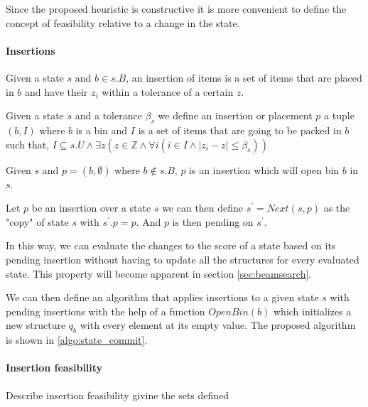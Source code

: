 Since the proposed heuristic is constructive it is more convenient to define the concept of feasibility relative to a change in the state.

\paragraph*{Insertions}

Given a state $s$ and $b \in s.B$, an insertion of items is a set of items that are placed in $b$ and have their $z_i$ within a tolerance of a certain $z$.

\begin{definition}[Insertion]
    \label{def:insertion}%
    Given a state $s$ and a tolerance $\beta_s$ we define an insertion or placement $p$ a tuple $(b, I)$ where $b$ is a bin and $I$ is a set of items that are going to be packed in $b$ such that, $I \subseteq s.U \land \exists z (z \in \mathbb{Z} \land \forall i ( i \in I \land |z_i - z| \le \beta_s))$
\end{definition}

\begin{observation}
    \label{oss:state_bin_open}
    Given $s$ and $p = (b, \emptyset)$ where $b \notin s.B$, $p$ is an insertion which will open bin $b$ in $s$.
\end{observation}

\begin{definition}[Next]
    \label{def:state_next}%
    Let $p$ be an insertion over a state $s$ we can then define $s^\prime = Next(s, p)$ as the "copy" of state $s$ with $s^\prime.p = p$. And $p$ is then pending on $s^\prime$.
\end{definition}

In this way, we can evaluate the changes to the score of a state based on its pending insertion without having to update all the structures for every evaluated state. This property will become apparent in section \ref{sec:beamsearch}. 

We can then define an algorithm that applies insertions to a given state $s$ with pending insertions with the help of a function $OpenBin(b)$ which initializes a new structure $q_b$ with every element at its empty value.
The proposed algorithm is shown in \ref{algo:state_commit}.



\paragraph*{Insertion feasibility}
Describe insertion feasibility givine the sets defined\\


